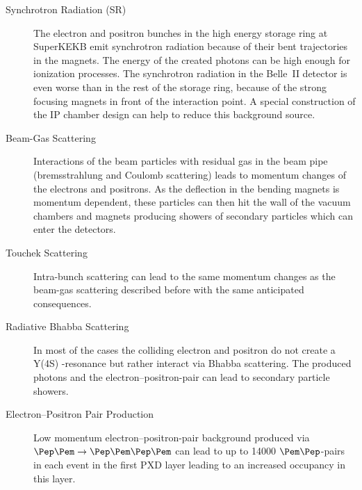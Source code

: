 \begin{description}
 \item[Synchrotron Radiation (SR)] The electron and positron bunches in the high energy storage ring at SuperKEKB emit synchrotron radiation because of their bent trajectories in the magnets. The energy of the created photons can be high enough for ionization processes. The synchrotron radiation in the Belle~II detector is even worse than in the rest of the storage ring, because of the strong focusing magnets in front of the interaction point. A special construction of the IP chamber design can help to reduce this background source.
 \item[Beam-Gas Scattering] Interactions of the beam particles with residual gas in the beam pipe (bremsstrahlung and Coulomb scattering) leads to momentum changes of the electrons and positrons. As the deflection in the bending magnets is momentum dependent, these particles can then hit the wall of the vacuum chambers and magnets producing showers of secondary particles which can enter the detectors.
 \item[Touchek Scattering] Intra-bunch scattering can lead to the same momentum changes as the beam-gas scattering described before with the same anticipated consequences.
 \item[Radiative Bhabba Scattering] In most of the cases the colliding electron and positron do not create a Y(4S) -resonance but rather interact via Bhabba scattering. The produced photons and the electron--positron-pair can lead to secondary particle showers.
 \item[Electron--Positron Pair Production] Low momentum electron--positron-pair background produced via $\Pep \Pem \to \Pep \Pem \Pep \Pem$ can lead to up to 14000 $\Pem\Pep$-pairs in each event in the first PXD layer leading to an increased occupancy in this layer.
\end{description}
